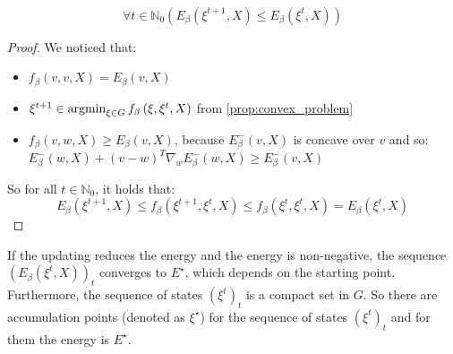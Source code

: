 \begin{proposition} \\
	\[
	\forall{t\in\mathbb{N}_0}\left(E_{\beta}\left(\xi^{t+1},X\right)\leq E_{\beta}\left(\xi^{t},X\right)\right)
	\]
	\begin{proof} We noticed that:
		\begin{itemize}[itemsep=2pt, topsep=10pt]
			\item $f_{\beta}\left(v,v,X\right) = E_{\beta}\left(v,X\right)$
			\item $\xi^{t+1}\in\operatorname{argmin}_{\xi\in G} f_{\beta}\left(\xi,\xi^{t},X\right)$ from \cref{prop:convex_problem}
			\item $f_{\beta}\left(v,w,X\right) \geq E_{\beta}\left(v,X\right)$, because $E_{\beta}^{-}\left(v,X\right)$ is concave over $v$ and so:\\
			$E_{\beta}^{-}\left(w,X\right) + \left(v-w\right)^T\nabla_{w}E_\beta^{-}\left(w,X\right) \geq E_\beta^{-}\left(v,X\right)$
		\end{itemize}
		So for all $t\in\mathbb{N}_0$, it holds that:
		\[
		E_{\beta}\left(\xi^{t+1},X\right) \leq f_{\beta}\left(\xi^{t+1},\xi^{t},X\right) \leq f_{\beta}\left(\xi^{t},\xi^{t},X\right) = E_{\beta}\left(\xi^{t},X\right)
		\]
	\end{proof}
\end{proposition}
If the updating reduces the energy and the energy is non-negative, the sequence $\left(E_{\beta}\left(\xi^{t},X\right)\right)_t$ converges to $E^\star$, which depends on the starting point.\\
Furthermore, the sequence of states $\left(\xi^{t}\right)_t$ is a compact set in $G$. So there are accumulation points (denoted as $\xi^\star$) for the sequence of states $\left(\xi^{t}\right)_t$ and for them the energy is $E^\star$.
